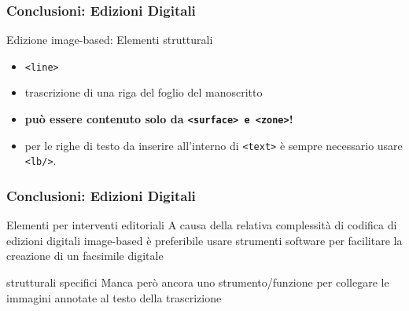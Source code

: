 \begin{frame}
    \frametitle{Conclusioni: Edizioni Digitali}
    \addtocounter{nframe}{1}
    

    \begin{block}{Edizione image-based: Elementi strutturali}
        \begin{itemize}
            \item \texttt{<line> }
            \item[] trascrizione di una riga del foglio del manoscritto 
            \item[] \textbf{può essere contenuto solo da \texttt{<surface> e <zone>}!}
            \item per le righe di testo da inserire all’interno di \texttt{<text>} è sempre necessario usare \texttt{<lb/>}.
        \end{itemize}
    \end{block}
\end{frame}

\begin{frame}
    \frametitle{Conclusioni: Edizioni Digitali}
    \addtocounter{nframe}{1}
    

    \begin{block}{Elementi per interventi editoriali}
        A causa della relativa complessità di codifica di edizioni digitali image-based è preferibile usare strumenti software per facilitare la creazione di un facsimile digitale
    \end{block}

    \begin{block}{strutturali specifici}
        Manca però ancora uno strumento/funzione per collegare le immagini annotate al testo della trascrizione
    \end{block}
\end{frame}

